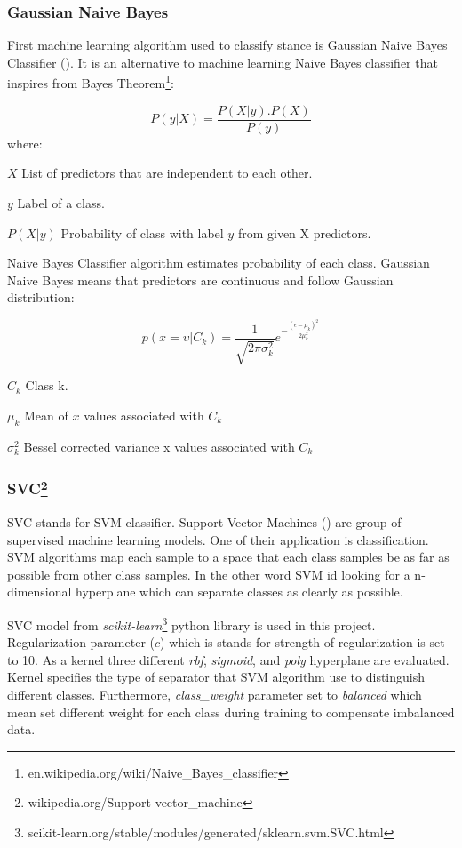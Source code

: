\subsubsection{Gaussian Naive Bayes}
First machine learning algorithm used to classify stance is Gaussian Naive Bayes Classifier (\cite{GNbayes}). It is an alternative to machine learning Naive Bayes classifier that inspires from Bayes Theorem\footnote{en.wikipedia.org/wiki/Naive\_Bayes\_classifier}:

\[ P\left(y | X\right) =   \frac{P(X|y).P(X)}{P(y)} \]
where:
\begin{eqexpl}[25mm]
	\item{$X$} List of predictors that are independent to each other.
	\item{$y$} Label of a class.
	\item{$P\left(X|y\right)$} Probability of class with label $y$ from given X predictors.
\end{eqexpl}
 Naive Bayes Classifier algorithm estimates probability of each class. Gaussian Naive Bayes means that predictors are continuous and follow Gaussian distribution:
 
 \[p\left(x=\upsilon | C_{k}\right) = \frac{1}{\sqrt{2\pi\sigma_{k}^{2}}}e^{-\frac{\left(\epsilon-\mu_{k}\right)^{2}}{2\mu^{2}_{k}}}\]
\begin{eqexpl}[25mm]
	\item{$C_{k}$} Class k.
	\item{$\mu_{k}$} Mean of $x$ values associated with $C_{k}$
	\item{$\sigma^{2}_{k}$} Bessel corrected variance x values associated with $C_{k}$
\end{eqexpl}

\subsubsection{SVC\protect\footnote{wikipedia.org/Support-vector\_machine}}
\label{SVM}
SVC stands for SVM classifier. Support Vector Machines (\cite{svc})  are group of supervised machine learning models. One of their application is classification. SVM algorithms map each sample to a space that each class samples be as far as possible from other class samples. In the other word SVM id looking for a n-dimensional hyperplane which can separate classes as clearly as possible.

SVC model from \textit{scikit-learn}\footnote{scikit-learn.org/stable/modules/generated/sklearn.svm.SVC.html} python library is used in this project. Regularization parameter ($ c $) which is stands for strength of regularization is set to 10. As a kernel three different \textit{rbf}, \textit{sigmoid}, and \textit{poly} hyperplane are evaluated. Kernel specifies the type of separator that SVM algorithm use to distinguish different classes. Furthermore, \textit{class\_weight} parameter set to \textit{balanced} which mean set different weight for each class during training to compensate imbalanced data. 



